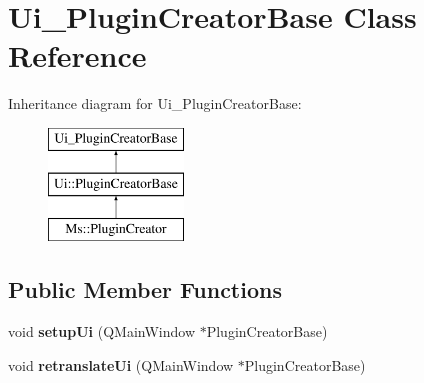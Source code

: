 \hypertarget{class_ui___plugin_creator_base}{}\section{Ui\+\_\+\+Plugin\+Creator\+Base Class Reference}
\label{class_ui___plugin_creator_base}
Inheritance diagram for Ui\+\_\+\+Plugin\+Creator\+Base\+:\begin{figure}[H]
\begin{center}
\leavevmode
\includegraphics[height=3.000000cm]{class_ui___plugin_creator_base}
\end{center}
\end{figure}
\subsection*{Public Member Functions}
\begin{DoxyCompactItemize}
\item 
\mbox{\label{class_ui___plugin_creator_base_af64d8cc9ade8a7b9da88e2eb9a40e0e0}} 
void {\bfseries setup\+Ui} (Q\+Main\+Window $\ast$Plugin\+Creator\+Base)
\item 
\mbox{\label{class_ui___plugin_creator_base_a3f8bf1f7dfaad43b068df196b2a1d4e5}} 
void {\bfseries retranslate\+Ui} (Q\+Main\+Window $\ast$Plugin\+Creator\+Base)
\end{DoxyCompactItemize}
